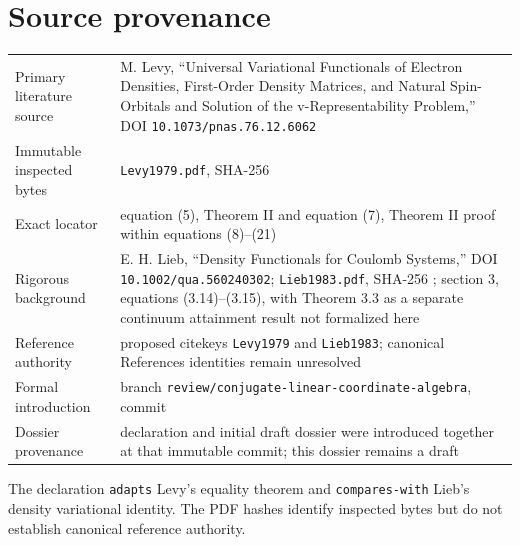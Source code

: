 \section{Source provenance}
\begin{tabularx}{\textwidth}{@{}lY@{}}
\toprule
Primary literature source & M. Levy, ``Universal Variational Functionals of Electron Densities, First-Order Density Matrices, and Natural Spin-Orbitals and Solution of the v-Representability Problem,'' DOI \texttt{10.1073/pnas.76.12.6062} \\
Immutable inspected bytes & \texttt{Levy1979.pdf}, SHA-256  \\
Exact locator & equation (5), Theorem II and equation (7), Theorem II proof within equations (8)--(21) \\
Rigorous background & E. H. Lieb, ``Density Functionals for Coulomb Systems,'' DOI \texttt{10.1002/qua.560240302}; \texttt{Lieb1983.pdf}, SHA-256 ; section 3, equations (3.14)--(3.15), with Theorem 3.3 as a separate continuum attainment result not formalized here \\
Reference authority & proposed citekeys \texttt{Levy1979} and \texttt{Lieb1983}; canonical References identities remain unresolved \\
Formal introduction & branch \texttt{review/conjugate-linear-coordinate-algebra}, commit  \\
Dossier provenance & declaration and initial draft dossier were introduced together at that immutable commit; this dossier remains a draft \\
\bottomrule
\end{tabularx}
The declaration \texttt{adapts} Levy's equality theorem and \texttt{compares-with} Lieb's density
variational identity.  The PDF hashes identify inspected bytes but do not establish canonical
reference authority.

